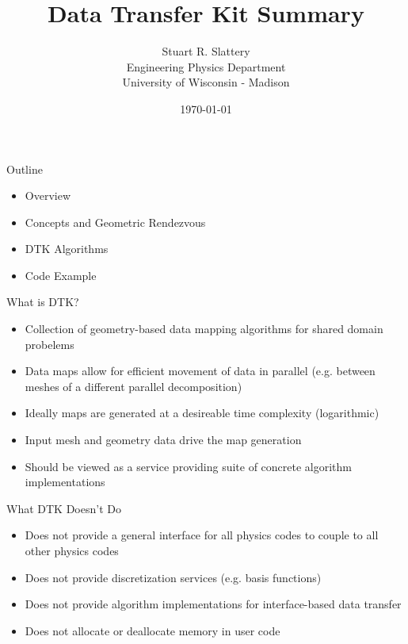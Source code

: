 \documentclass{beamer}
\author{Stuart R. Slattery
  \\ Engineering Physics Department
  \\ University of Wisconsin - Madison
}
\date{\today}
\title{Data Transfer Kit Summary}
\begin{document}
\maketitle

\begin{frame}{Outline}

  \begin{itemize}
  \item Overview
    \medskip
  \item Concepts and Geometric Rendezvous
    \medskip
  \item DTK Algorithms
    \medskip
  \item Code Example
  \end{itemize}

\end{frame}

\begin{frame}{What is DTK?}

  \begin{itemize}
  \item Collection of geometry-based data mapping algorithms for
    shared domain probelems
    \medskip
  \item Data maps allow for efficient movement of data in parallel
    (e.g. between meshes of a different parallel decomposition)
    \medskip
  \item Ideally maps are generated at a desireable time complexity
    (logarithmic)
    \medskip
  \item Input mesh and geometry data drive the map generation
    \medskip
  \item Should be viewed as a service providing suite of concrete
    algorithm implementations
  \end{itemize}
 
\end{frame}

\begin{frame}{What DTK Doesn't Do}

  \begin{itemize}
  \item Does not provide a general interface for all physics codes to
    couple to all other physics codes
    \medskip
  \item Does not provide discretization services (e.g. basis functions)
    \medskip
  \item Does not provide algorithm implementations for interface-based
    data transfer
    \medskip
  \item Does not allocate or deallocate memory in user code
  \end{itemize}

\end{frame}
\end{document}
